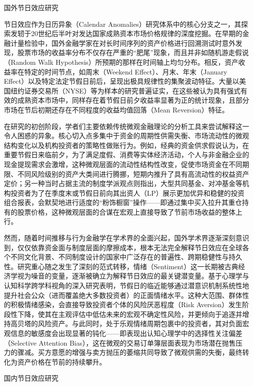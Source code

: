 \documentclass{cupb-thesis}
\begin{document}
国外节日效应研究

节日效应作为日历异象（Calendar Anomalies）研究体系中的核心分支之一，其探索发轫于20世纪后半叶对发达国家成熟资本市场价格规律的深度挖掘。在早期的金融计量检验中，国外金融学家在对长时间序列的资产价格进行回溯测试时意外发现，股票市场的收益率分布不仅存在严重的“肥尾”现象，而且并非如随机游走假说（Random Walk Hypothesis）所预期的那样在时间轴上均匀分布。相反，资产收益率在特定的时间节点，如周末（Weekend Effect）、月末、年末（January Effect）以及特定法定节假日前后，呈现出极具规律性的集聚波动特征。大量以美国纽约证券交易所（NYSE）等为样本的研究普遍证实，在这些被认为具有强式有效的成熟资本市场中，同样存在着节假日前夕收益率显著为正的统计现象，且部分市场在节后初期还存在不同程度的收益均值回落（Mean Reversion）特征。


在研究的初创阶段，学者们主要依赖传统微观金融理论的分析工具来尝试解释这一令人困惑的异象。核心切入点多集中于资金的周期性供需失衡、市场流动性的微观结构变化以及机构投资者的策略性做账行为。例如，经典的资金供求假说认为，在重要节假日来临前夕，为了满足度假、消费等实体经济活动，个人与非金融企业的现金提现需求会激增，这种微观层面的流动性结构性改变，促使市场资金在不同期限、不同风险级别的资产大类间进行腾挪，短期内推升了具有高流动性的权益资产定价；另一种当时占据主流的制度学派观点则指出，大型共同基金、对冲基金等机构投资者为了在季度末或节假日前向其出资人（LP）展示更加优异和稳健的投资组合报表，会默契地进行适度的“粉饰橱窗”操作——即通过集中买入拉升其重仓持有的股票价格，这种微观层面的合谋在宏观上直接导致了节前市场收益的整体上行。


然而，随着时间推移与行为金融学在学术界的全面兴起，国外学术界逐渐深刻意识到，仅仅依靠资金面与制度层面的摩擦成本，根本无法完全解释节日效应在全球各个不同文化背景、不同制度设计的国家中广泛存在的普遍性、跨期稳健性与持久性。研究重心随之发生了深刻的范式转移，情绪（Sentiment）这一长期被古典经济学视为噪音的变量，逐渐被确立为解释节日效应的最关键潜变量。基于心理学与认知科学跨学科视角的深入研究表明，节假日的临近能够通过潜意识机制系统性地提升社会公众（进而覆盖绝大多数投资者）的正面情绪水平。这种大范围、群体性的积极情绪感染，会直接导致投资者个体的风险厌恶程度（Risk Aversion）发生阶段性下降，使其在主观评估中低估未来的宏观不确定性风险，并更倾向于追逐并增持高贝塔的风险资产。与此同时，处于乐观情绪周期包裹中的投资者，其对负面宏观信息的敏感度会出现显著的钝化——即表现出认知心理学中的选择性关注偏差（Selective Attention Bias），这在微观的交易订单簿层面表现为市场潜在抛售压力的骤减。买方意愿的增强与卖方抛压的萎缩共同导致了微观供需的失衡，最终转化为资产价格在节前的持续攀升。


国内节日效应研究
\end{document}
